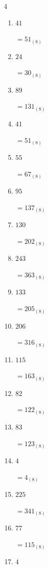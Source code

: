 \begin{multicols}{4}
\begin{enumerate}
  \item $41$

        $=51_{(8)}$

  \item $24$

        $=30_{(8)}$

  \item $89$

        $=131_{(8)}$

  \item $41$

        $=51_{(8)}$

  \item $55$

        $=67_{(8)}$

  \item $95$

        $=137_{(8)}$

  \item $130$

        $=202_{(8)}$

  \item $243$

        $=363_{(8)}$

  \item $133$

        $=205_{(8)}$

  \item $206$

        $=316_{(8)}$

  \item $115$

        $=163_{(8)}$

  \item $82$

        $=122_{(8)}$

  \item $83$

        $=123_{(8)}$

  \item $4$

        $=4_{(8)}$

  \item $225$

        $=341_{(8)}$

\columnbreak %

  \item $77$

        $=115_{(8)}$

  \item $4$


\end{enumerate}
\end{multicols}
